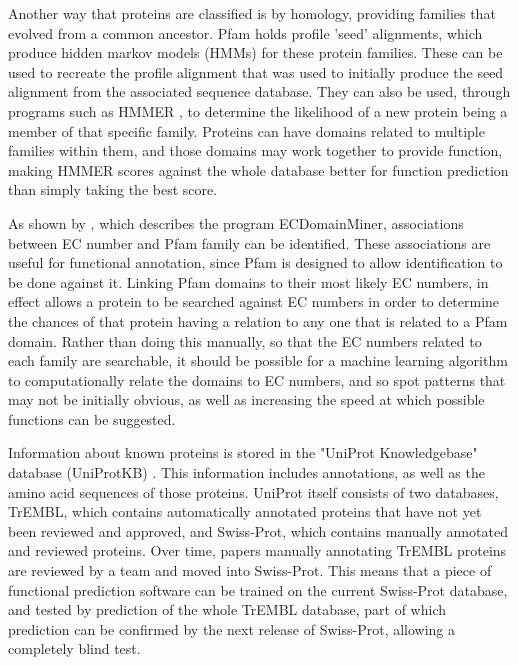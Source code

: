 \documentclass[12pt]{report}
\begin{document}
		Another way that proteins are classified is by homology, providing families that evolved from a common ancestor.  Pfam \citep{RefWorks:doc:5d6e641de4b0a51fb0eed90f} holds profile 'seed' alignments, which produce hidden markov models (HMMs) for these protein families.  These can be used to recreate the profile alignment that was used to initially produce the seed alignment from the associated sequence database.  They can also be used, through programs such as HMMER \citep{RefWorks:doc:5c8f77ece4b077fbbf563f6a}, to determine the likelihood of a new protein being a member of that specific family. Proteins can have domains related to multiple families within them, and those domains may work together to provide function, making HMMER scores against the whole database better for function prediction than simply taking the best score.%
		
		As shown by \cite{RefWorks:doc:5d6f9c26e4b0ec3eed182252}, which describes the program ECDomainMiner, associations between EC number and Pfam family can be identified.  These associations are useful for functional annotation, since Pfam is designed to allow identification to be done against it.  Linking Pfam domains to their most likely EC numbers, in effect allows a protein to be searched against EC numbers in order to determine the chances of that protein having a relation to any one that is related to a Pfam domain.  Rather than doing this manually, so that the EC numbers related to each family are searchable, it should be possible for a machine learning algorithm to computationally relate the domains to EC numbers, and so spot patterns that may not be initially obvious, as well as increasing the speed at which possible functions can be suggested. %
		
		Information about known proteins is stored in the "UniProt Knowledgebase" database (UniProtKB) \citep{RefWorks:doc:5d80d882e4b074875bbeabb7}.  This information includes annotations, as well as the amino acid sequences of those proteins.  UniProt itself consists of two databases, TrEMBL, which contains automatically annotated proteins that have not yet been reviewed and approved, and Swiss-Prot, which contains manually annotated and reviewed proteins.  Over time, papers manually annotating TrEMBL proteins are reviewed by a team and moved into Swiss-Prot.  This means that a piece of functional prediction software can be trained on the current Swiss-Prot database, and tested by prediction of the whole TrEMBL database, part of which prediction can be confirmed by the next release of Swiss-Prot, allowing a completely blind test. %
		
\end{document}
